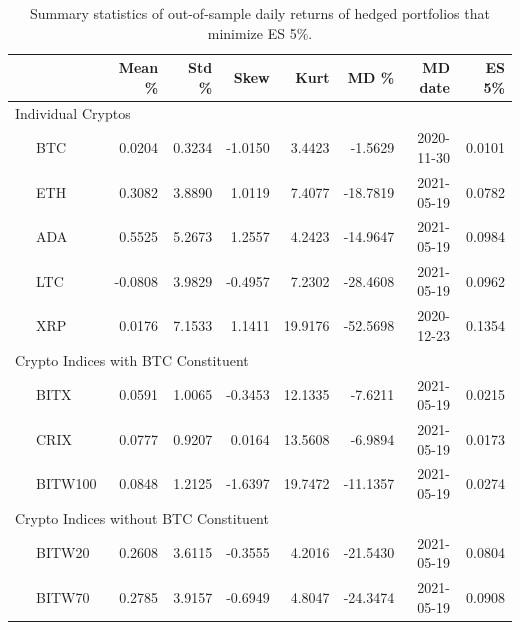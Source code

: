 \documentclass[11pt,a4paper,english]{article}
\begin{document}
{\begin{table}[!]
\end{table}\begin{table}[!] \centering %
  {%
\begin{tabular}{lrrrrrrr} \toprule
         {} &    Mean \% &     Std \% &      Skew &       Kurt &         MD \% &     MD date & ES 5\% \\
\midrule
     \multicolumn{7}{l}{Individual Cryptos}                                                                                 \\
\ \ \ BTC     &  0.0204 &  0.3234 & -1.0150 &   3.4423 &  -1.5629 &  2020-11-30 &  0.0101 \\
\ \ \ ETH     &  0.3082 &  3.8890 &  1.0119 &   7.4077 & -18.7819 &  2021-05-19 &  0.0782 \\
\ \ \ ADA     &  0.5525 &  5.2673 &  1.2557 &   4.2423 & -14.9647 &  2021-05-19 &  0.0984 \\
\ \ \ LTC     & -0.0808 &  3.9829 & -0.4957 &   7.2302 & -28.4608 &  2021-05-19 &  0.0962 \\
\ \ \ XRP     &  0.0176 &  7.1533 &  1.1411 &  19.9176 & -52.5698 &  2020-12-23 &  0.1354 \\
   \multicolumn{7}{l}{Crypto Indices with BTC Constituent}                                                                  \\
\ \ \ BITX    &  0.0591 &  1.0065 & -0.3453 &  12.1335 &  -7.6211 &  2021-05-19 &  0.0215 \\
\ \ \ CRIX    &  0.0777 &  0.9207 &  0.0164 &  13.5608 &  -6.9894 &  2021-05-19 &  0.0173 \\
\ \ \ BITW100 &  0.0848 &  1.2125 & -1.6397 &  19.7472 & -11.1357 &  2021-05-19 &  0.0274 \\
    \multicolumn{7}{l}{Crypto Indices without BTC Constituent}                                                              \\
\ \ \ BITW20  &  0.2608 &  3.6115 & -0.3555 &   4.2016 & -21.5430 &  2021-05-19 &  0.0804 \\
\ \ \ BITW70  &  0.2785 &  3.9157 & -0.6949 &   4.8047 & -24.3474 &  2021-05-19 &  0.0908 \\
\bottomrule
\end{tabular}}
\caption{Summary statistics of out-of-sample daily returns of hedged portfolios that minimize ES 5\%.}
\label{tab:ES5_rh}


\end{table}}
\end{document}
